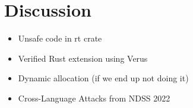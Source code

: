 \section{Discussion}
\begin{itemize}
    \item Unsafe code in rt crate
    \item Verified Rust extension using Verus
    \item Dynamic allocation (if we end up not doing it)
    \item Cross-Language Attacks from NDSS 2022
\end{itemize}